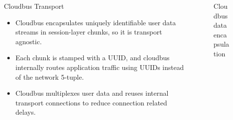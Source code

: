 \begin{frame}
{\begin{columns}
\begin{column}{0.5\textwidth}
\begin{block}{Cloudbus Transport}
					\footnotesize
					\begin{itemize}
						\item Cloudbus encapsulates uniquely identifiable user data streams in session-layer chunks, so it is transport agnostic.
						\item Each chunk is stamped with a UUID, and cloudbus internally routes application traffic using UUIDs instead of the network %
						5-tuple.
						\item Cloudbus multiplexes user data and reuses internal transport connections to reduce connection related delays.
					\end{itemize}
					\normalsize
				\end{block}
			\end{column}
			\begin{column}{0.5\textwidth}
				\begin{figure}
					
					\caption{Cloudbus data encapsulation}
				\end{figure}
			\end{column}
		\end{columns}

	}
\end{frame}